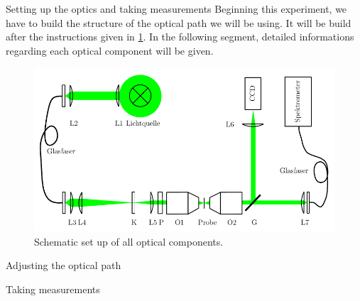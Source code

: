 \documentclass[pdftex, a4paper,11pt, twoside, UKenglish]{report}
\begin{document}
  \begin{chapter}{Setting up the optics and taking measurements}
    \label{chp:Setup}
    Beginning this experiment, we have to build the structure of the optical
    path we will be using. It will be build after the instructions given in
    \cref{fig:Setup}. In the following segment, detailed informations regarding
    each optical component will be given.
    \begin{figure}[hb]
      \centering
      \includegraphics[width=\textwidth]{Figures/Setup.png}
      \caption{Schematic set up of all optical components.\cite{bib:Anleitung}}
      \label{fig:Setup}
    \end{figure}
    
    \begin{section}{Adjusting the optical path}
      \label{chp:SetupOptics}
      
      
    \end{section}
    
    
    
    \begin{section}{Taking measurements}
      \label{chp:SetupMeasuring}
      
      
    \end{section}
    
  \end{chapter}
  
\end{document}
